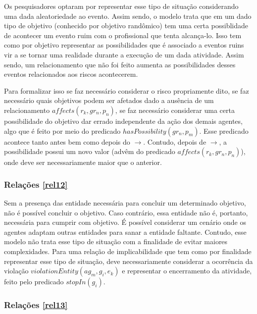 \documentclass[12pt]{article}
\begin{document}
Os pesquisadores optaram por representar esse tipo de situação considerando uma dada aleatoriedade ao evento. Assim sendo, o modelo trata que em um dado tipo de objetivo (conhecido por objetivo randômico) tem uma certa possiblidade de acontecer um evento ruim com o profissional que tenta alcança-lo. Isso tem como por objetivo representar as possibilidades que é associado a eventos ruins vir a se tornar uma realidade durante a execução de um dada atividade. Assim sendo, um relacionamento que não foi feito aumenta as possibilidades desses eventos relacionados aos riscos acontecerem. 

Para formalizar isso se faz necessário considerar o risco propriamente dito, se faz necessário quais objetivos podem ser afetados dado a ausência de um relacionamento $affects(r_k,gr_n,p_n)$, se faz necessário considerar uma certa possibilidade do objetivo dar errado independente da ação dos demais agentes, algo que é feito por meio do predicado  $hasPossibility(gr_n,p_m)$. Esse predicado acontece tanto antes bem como depois do $\to$. Contudo, depois de $\to$, a possibilidade possui um novo valor (advêm do predicado $affects(r_k,gr_n,p_n)$), onde deve ser necessariamente maior que o anterior.

\subsubsection{Relações \ref{rel12}}

Sem a presença das entidade necessária para concluir um determinado objetivo, não é possível concluir o objetivo. Caso contrário, essa entidade não é, portanto, necessária para cumprir com objetivo. É possível considerar um cenário onde os agentes adaptam outras entidades para sanar a entidade faltante. Contudo, esse modelo não trata esse tipo de situação com a finalidade de evitar maiores complexidades. Para uma relação de implicabilidade que tem como por finalidade representar esse tipo de situação, deve necessariamente considerar a ocorrência da violação $violationEntity(ag_m,g_i,e_k)$ e representar o encerramento da atividade, feito pelo predicado $stopIn(g_i)$.

\subsubsection{Relações \ref{rel13}}
\end{document}
